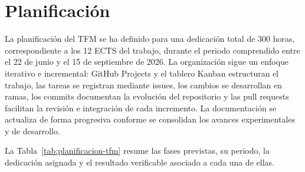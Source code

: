 \section{Planificación}

La planificación del TFM se ha definido para una dedicación total de 300 horas, correspondiente a los 12 ECTS del trabajo, durante el periodo comprendido entre el 22 de junio y el 15 de septiembre de 2026. La organización sigue un enfoque iterativo e incremental: GitHub Projects y el tablero Kanban estructuran el trabajo, las tareas se registran mediante issues, los cambios se desarrollan en ramas, los commits documentan la evolución del repositorio y las pull requests facilitan la revisión e integración de cada incremento. La documentación se actualiza de forma progresiva conforme se consolidan los avances experimentales y de desarrollo.

La Tabla~\ref{tab:planificacion-tfm} resume las fases previstas, su periodo, la dedicación asignada y el resultado verificable asociado a cada una de ellas.

